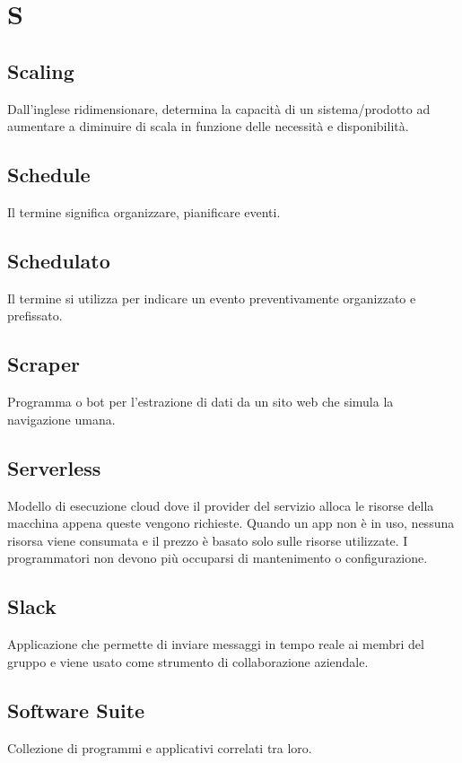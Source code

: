 \documentclass{classes/base}
\begin{document}
    \section{S}
        \subsection*{Scaling}       
        Dall'inglese ridimensionare, determina la capacità di un sistema/prodotto ad aumentare a diminuire di scala in funzione delle necessità e disponibilità.

        \subsection*{Schedule} 
        Il termine significa organizzare, pianificare eventi.

        \subsection*{Schedulato}
        Il termine si utilizza per indicare un evento preventivamente organizzato e prefissato.
        
        \subsection*{Scraper}
        Programma o bot per l'estrazione di dati da un sito web che simula la navigazione umana.
        
        \subsection*{Serverless}
        Modello di esecuzione cloud dove il provider del servizio alloca le risorse della macchina appena queste vengono richieste. Quando un app non è in uso, nessuna risorsa viene consumata e il prezzo è basato solo sulle risorse utilizzate. I programmatori non devono più occuparsi di mantenimento o configurazione.

        \subsection*{Slack} 
        Applicazione che permette di inviare messaggi in tempo reale ai membri del gruppo e viene usato come strumento di collaborazione aziendale.

        \subsection*{Software Suite} 
        Collezione di programmi e applicativi correlati tra loro.
        
\end{document}
